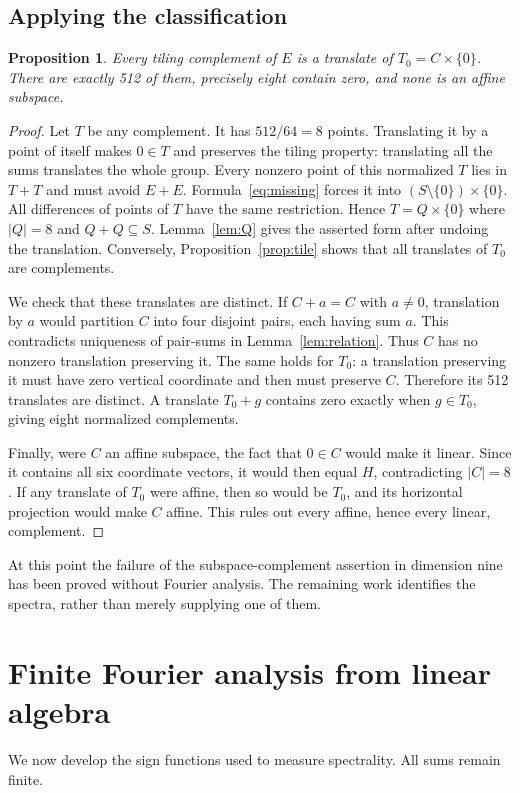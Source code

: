 \documentclass[11pt]{article}
\numberwithin{equation}{section}
\newtheorem{proposition}[theorem]{Proposition}
\theoremstyle{definition}
\theoremstyle{remark}\newtheorem{remark}[theorem]{Remark}
\begin{document}
\subsection{Applying the classification}
\begin{proposition}\label{prop:allT}
Every tiling complement of $E$ is a translate of $T_0=C\times\{0\}$. There are exactly 512 of them, precisely eight contain zero, and none is an affine subspace.
\end{proposition}
\begin{proof}
Let $T$ be any complement. It has $512/64=8$ points. Translating it by a point of itself makes $0\in T$ and preserves the tiling property: translating all the sums translates the whole group. Every nonzero point of this normalized $T$ lies in $T+T$ and must avoid $E+E$. Formula~\eqref{eq:missing} forces it into $(S\setminus\{0\})\times\{0\}$. All differences of points of $T$ have the same restriction. Hence $T=Q\times\{0\}$ where $|Q|=8$ and $Q+Q\subseteq S$. Lemma~\ref{lem:Q} gives the asserted form after undoing the translation. Conversely, Proposition~\ref{prop:tile} shows that all translates of $T_0$ are complements.

We check that these translates are distinct. If $C+a=C$ with $a\ne0$, translation by $a$ would partition $C$ into four disjoint pairs, each having sum $a$. This contradicts uniqueness of pair-sums in Lemma~\ref{lem:relation}. Thus $C$ has no nonzero translation preserving it. The same holds for $T_0$: a translation preserving it must have zero vertical coordinate and then must preserve $C$. Therefore its 512 translates are distinct. A translate $T_0+g$ contains zero exactly when $g\in T_0$, giving eight normalized complements.

Finally, were $C$ an affine subspace, the fact that $0\in C$ would make it linear. Since it contains all six coordinate vectors, it would then equal $H$, contradicting $|C|=8$. If any translate of $T_0$ were affine, then so would be $T_0$, and its horizontal projection would make $C$ affine. This rules out every affine, hence every linear, complement.
\end{proof}
At this point the failure of the subspace-complement assertion in dimension nine has been proved without Fourier analysis. The remaining work identifies the spectra, rather than merely supplying one of them.

\section{Finite Fourier analysis from linear algebra}\label{sec:fourier}
We now develop the sign functions used to measure spectrality. All sums remain finite.
\end{document}
